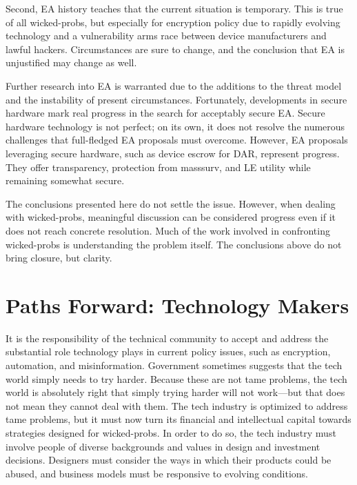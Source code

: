 Second, \ac{EA} history teaches that the current situation is temporary. This is true of all \acp{wicked-prob}, but
especially for encryption policy due to rapidly evolving technology and a vulnerability arms race between device
manufacturers and lawful hackers. Circumstances are sure to change, and the conclusion that \ac{EA} is unjustified may
change as well.


Further research into \ac{EA} is warranted due to the additions to the threat model and the instability of present
circumstances. Fortunately, developments in secure hardware mark real progress in the search for acceptably secure
\ac{EA}. Secure hardware technology is not perfect; on its own, it does not resolve the numerous challenges that
full-fledged \ac{EA} proposals must overcome. However, \ac{EA} proposals leveraging secure hardware, such as device
escrow for \acl{DAR}, represent progress. They offer transparency, protection from \ac{masssurv}, and \acl{LE} utility
while remaining somewhat secure.

The conclusions presented here do not settle the issue. However, when dealing with \acp{wicked-prob}, meaningful
discussion can be considered progress even if it does not reach concrete resolution. Much of the work involved in
confronting \acp{wicked-prob} is understanding the problem itself. The conclusions above do not bring closure, but
clarity.


\section{Paths Forward: Technology Makers}

It is the responsibility of the technical community to accept and address the substantial role technology plays in
current policy issues, such as encryption, automation, and misinformation. Government sometimes suggests that the tech
world simply needs to try harder. Because these are not tame problems, the tech world is absolutely right that
simply trying harder will not work---but that does not mean they cannot deal with them. The tech industry is optimized
to address tame problems, but it must now turn its financial and intellectual capital towards strategies designed for
\acp{wicked-prob}. In order to do so, the tech industry must involve people of diverse backgrounds and values in design
and investment decisions. Designers must consider the ways in which their products could be abused, and business models
must be responsive to evolving conditions.

